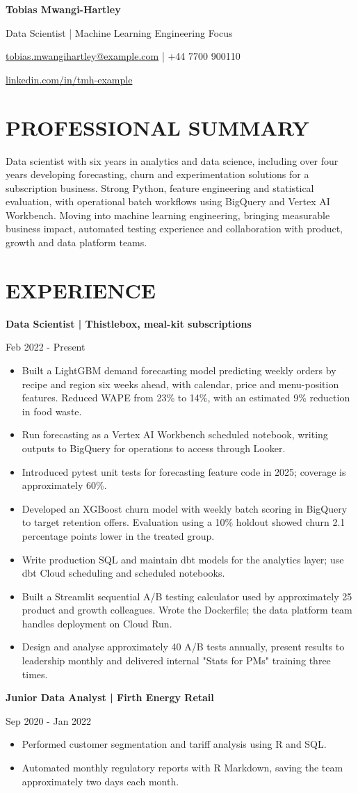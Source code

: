 \documentclass[11pt,a4paper]{article}
\newcommand{\cvsection}[1]{\section*{#1}}
\begin{document}
{\LARGE\bfseries\color{primarycolor} Tobias Mwangi-Hartley}\par
\vspace{0.3em}
{\large\color{accentcolor} Data Scientist | Machine Learning Engineering Focus}\par
\href{mailto:tobias.mwangihartley@example.com}{tobias.mwangihartley@example.com} | +44 7700 900110\par
\href{https://linkedin.com/in/tmh-example}{linkedin.com/in/tmh-example}

\cvsection{PROFESSIONAL SUMMARY}
Data scientist with six years in analytics and data science, including over four years developing forecasting, churn and experimentation solutions for a subscription business. Strong Python, feature engineering and statistical evaluation, with operational batch workflows using BigQuery and Vertex AI Workbench. Moving into machine learning engineering, bringing measurable business impact, automated testing experience and collaboration with product, growth and data platform teams.

\cvsection{EXPERIENCE}
\textbf{Data Scientist | Thistlebox, meal-kit subscriptions}\par
Feb 2022 - Present
\begin{itemize}
\item Built a LightGBM demand forecasting model predicting weekly orders by recipe and region six weeks ahead, with calendar, price and menu-position features. Reduced WAPE from 23\% to 14\%, with an estimated 9\% reduction in food waste.
\item Run forecasting as a Vertex AI Workbench scheduled notebook, writing outputs to BigQuery for operations to access through Looker.
\item Introduced pytest unit tests for forecasting feature code in 2025; coverage is approximately 60\%.
\item Developed an XGBoost churn model with weekly batch scoring in BigQuery to target retention offers. Evaluation using a 10\% holdout showed churn 2.1 percentage points lower in the treated group.
\item Write production SQL and maintain dbt models for the analytics layer; use dbt Cloud scheduling and scheduled notebooks.
\item Built a Streamlit sequential A/B testing calculator used by approximately 25 product and growth colleagues. Wrote the Dockerfile; the data platform team handles deployment on Cloud Run.
\item Design and analyse approximately 40 A/B tests annually, present results to leadership monthly and delivered internal "Stats for PMs" training three times.
\end{itemize}
\vspace{0.3em}
\textbf{Junior Data Analyst | Firth Energy Retail}\par
Sep 2020 - Jan 2022
\begin{itemize}
\item Performed customer segmentation and tariff analysis using R and SQL.
\item Automated monthly regulatory reports with R Markdown, saving the team approximately two days each month.
\end{itemize}
\end{document}
